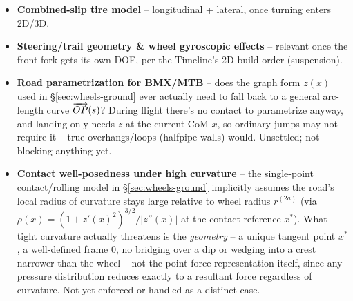 \begin{aiblock}
\begin{itemize}
    \item \textbf{Combined-slip tire model} -- longitudinal + lateral, once turning enters 2D/3D.
    \item \textbf{Steering/trail geometry \& wheel gyroscopic effects} -- relevant once the front fork gets its own DOF, per the Timeline's 2D build order (suspension).
    \item \textbf{Road parametrization for BMX/MTB} -- does the graph form $z(x)$ used in \S\ref{sec:wheels-ground} ever actually need to fall back to a general arc-length curve $\overrightarrow{OP}(s)$? During flight there's no contact to parametrize anyway, and landing only needs $z$ at the current CoM $x$, so ordinary jumps may not require it -- true overhangs/loops (halfpipe walls) would. Unsettled; not blocking anything yet.
    \item \textbf{Contact well-posedness under high curvature} -- the single-point contact/rolling model in \S\ref{sec:wheels-ground} implicitly assumes the road's local radius of curvature stays large relative to wheel radius $r^{(2a)}$ (via $\rho(x) = (1+z'(x)^2)^{3/2}/|z''(x)|$ at the contact reference $x^*$). What tight curvature actually threatens is the \emph{geometry} -- a unique tangent point $x^*$, a well-defined frame $0$, no bridging over a dip or wedging into a crest narrower than the wheel -- not the point-force representation itself, since any pressure distribution reduces exactly to a resultant force regardless of curvature. Not yet enforced or handled as a distinct case.
\end{itemize}
\end{aiblock}
